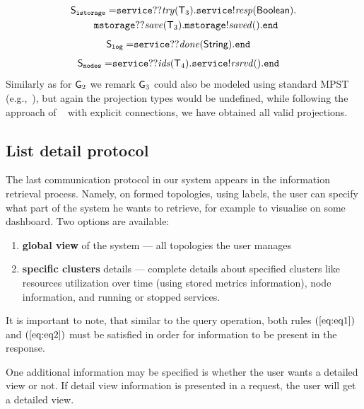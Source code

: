 \begin{align*}
	\ST_\mathtt{istorage} =  &
	\mathtt{service}{??}\mathit{try}(\T_3).\mathtt{service}{!}\mathit{resp}(\mathsf{Boolean}).\\ & \hspace{-8mm}
	\mathtt{mstorage}{??}\mathit{save}(\T_3).\mathtt{mstorage}{!}\mathit{saved}().\tend
\end{align*}
\begin{align*}
	{\mathsf S}_\mathtt{log} =  &
	\mathtt{service}{??}\mathit{done}(\mathsf{String}).\mathtt{end}
\end{align*}
\begin{align*}
	{\mathsf S}_\mathtt{nodes} =  &
	\mathtt{service}{??}\mathit{ids}({\mathsf T}_4).\mathtt{service}{!}\mathit{rsrvd}().\mathtt{end}
\end{align*}
Similarly as for ${\sf G}_2$ we remark ${\sf G}_3$ could also be modeled using standard MPST (e.g.,~\cite{HondaYC08}), but again the projection types would be undefined, while following the approach of ~\cite{HuY17} with explicit connections, we have obtained all valid projections.
%
%
\subsection{List detail protocol}\label{sec:list_detail_protocol}
%
The last communication protocol in our system appears in the information retrieval process. Namely, on formed topologies, using labels, the user can specify what part of the system he wants to retrieve, for example to visualise on some dashboard. Two options are available: 

\begin{enumerate}[start=1,label={(\bfseries \arabic*)}]
	\item \textbf{global view} of the system --- all topologies the user manages
	\item \textbf{specific clusters} details --- complete details about specified clusters like resources utilization over time (using stored metrics information), node information, and running or stopped services.
\end{enumerate}

It is important to note, that similar to the query operation, both rules $(\ref{eq:eq1})$ and $(\ref{eq:eq2})$ must be satisfied in order for information to be present in the response. 

One additional information may be specified is whether the user wants a detailed view or not. If detail view information is presented in a request, the user will get a detailed view. 

